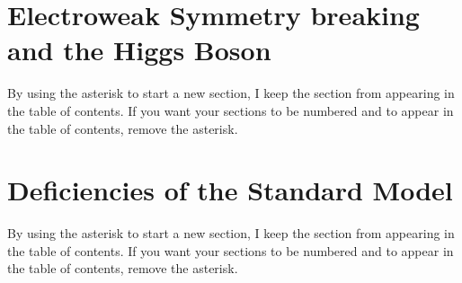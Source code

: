 \section{Electroweak Symmetry breaking and the Higgs Boson}

By using the asterisk to start a new section, I keep the section from appearing in the table of contents.
If you want your sections to be numbered and to appear in the table of contents, remove the asterisk.

\section{Deficiencies of the Standard Model}

By using the asterisk to start a new section, I keep the section from appearing in the table of contents.
If you want your sections to be numbered and to appear in the table of contents, remove the asterisk.
